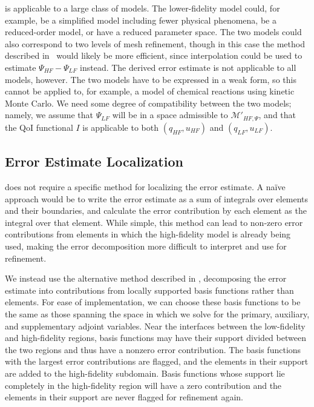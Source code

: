  is applicable to a large class of models. The lower-fidelity model could, for example, be a simplified model including fewer physical phenomena, be a reduced-order model, or have a reduced parameter space. The two models could also correspond to two levels of mesh refinement, though in this case the method described in~\cite{BecVex05} would likely be more efficient, since interpolation could be used to estimate $\Psi_{HF}-\Psi_{LF}$ instead. The derived error estimate is not applicable to all models, however. The two models have to be expressed in a weak form, so this cannot be applied to, for example, a model of chemical reactions using kinetic Monte Carlo. We need some degree of compatibility between the two models; namely, we assume that $\Psi_{LF}$ will be in a space admissible to $\mathcal{M}'_{HF,\Psi}$, and that the QoI functional $I$ is applicable to both $(q_{HF},u_{HF})$ and $(q_{LF},u_{LF})$.

\subsection{Error Estimate Localization}\label{sec:errLocal}
 does not require a specific method for localizing the error estimate. A na\"{i}ve approach would be to write the error estimate as a sum of integrals over elements and their boundaries, and calculate the error contribution by each element as the integral over that element. While simple, this method can lead to non-zero error contributions from elements in which the high-fidelity model is already being used, making the error decomposition more difficult to interpret and use for refinement.

We instead use the alternative method described in \cite{vanOpstaletal15}, decomposing the error estimate into contributions from locally supported basis functions rather than elements. For ease of implementation, we can choose these basis functions to be the same as those spanning the space in which we solve for the primary, auxiliary, and supplementary adjoint variables. Near the interfaces between the low-fidelity and high-fidelity regions, basis functions may have their support divided between the two regions and thus have a nonzero error contribution. The basis functions with the largest error contributions are flagged, and the elements in their support are added to the high-fidelity subdomain. Basis functions whose support lie completely in the high-fidelity region will have a zero contribution and the elements in their support are never flagged for refinement again.

